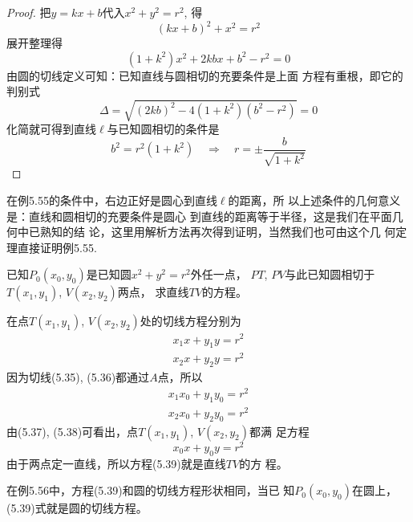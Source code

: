 \begin{proof}
    把$y=kx+b$代入$x^2+y^2=r^2$, 得
\[(kx+b)^2+x^2=r^2\]
展开整理得
\[(1+k^2)x^2+2kbx+b^2-r^2=0\]
由圆的切线定义可知：已知直线与圆相切的充要条件是上面
方程有重根，即它的判别式
\[\Delta=\sqrt{(2kb)^2-4(1+k^2)(b^2-r^2)}=0\]
化简就可得到直线$\ell$与已知圆相切的条件是
\[
    b^2=r^2(1+k^2)\quad \Rightarrow\quad   r=\pm\frac{b}{\sqrt{1+k^2}}
\]
\end{proof}

在例5.55的条件中，右边正好是圆心到直线$\ell$的距离，所
以上述条件的几何意义是：直线和圆相切的充要条件是圆心
到直线的距离等于半径，这是我们在平面几何中已熟知的结
论，这里用解析方法再次得到证明，当然我们也可由这个几
何定理直接证明例5.55.

\begin{example}
    已知$P_0(x_0,y_0)$是已知圆$x^2+y^2=r^2$外任一点，
$PT$, $PV$与此已知圆相切于$T(x_1,y_1)$, $V(x_2,y_2)$两点，
求直线$TV$的方程。
\end{example}


\begin{solution}
    在点$T(x_1,y_1)$, $V(x_2,y_2)$处的切线方程分别为
\begin{align}
    x_1x+y_1y=r^2\\
    x_2x+y_2y=r^2
\end{align}
因为切线(5.35), (5.36)都通过$A$点，所以
\begin{align}
    x_1x_0+y_1y_0=r^2\\
    x_2x_0+y_2y_0=r^2
\end{align}
由(5.37), (5.38)可看出，点$T(x_1,y_1)$, $V(x_2,y_2)$都满
足方程
\begin{equation}
    x_0x+y_0y=r^2
\end{equation}
由于两点定一直线，所以方程(5.39)就是直线$TV$的方
程。
\end{solution}


在例5.56中，方程(5.39)和圆的切线方程形状相同，当已
知$P_0(x_0,y_0)$在圆上，(5.39)式就是圆的切线方程。

